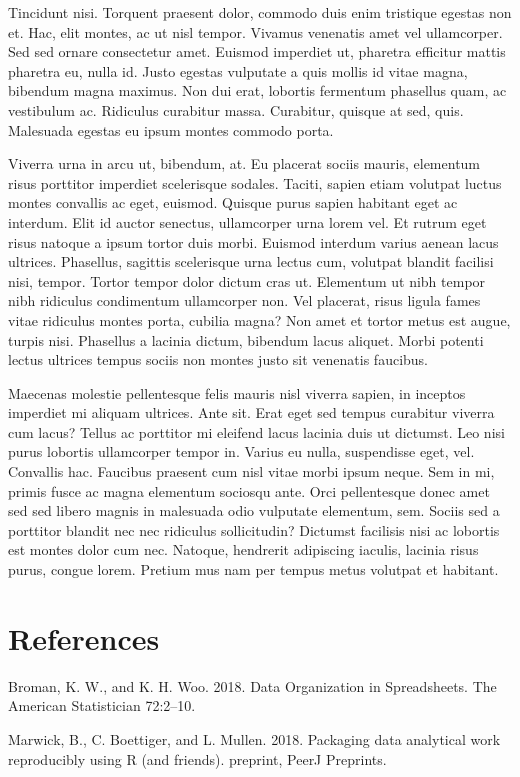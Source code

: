 \documentclass[11pt,]{report}
\begin{document}
Tincidunt nisi. Torquent praesent dolor, commodo duis enim tristique
egestas non et. Hac, elit montes, ac ut nisl tempor. Vivamus venenatis
amet vel ullamcorper. Sed sed ornare consectetur amet. Euismod imperdiet
ut, pharetra efficitur mattis pharetra eu, nulla id. Justo egestas
vulputate a quis mollis id vitae magna, bibendum magna maximus. Non dui
erat, lobortis fermentum phasellus quam, ac vestibulum ac. Ridiculus
curabitur massa. Curabitur, quisque at sed, quis. Malesuada egestas eu
ipsum montes commodo porta.

Viverra urna in arcu ut, bibendum, at. Eu placerat sociis mauris,
elementum risus porttitor imperdiet scelerisque sodales. Taciti, sapien
etiam volutpat luctus montes convallis ac eget, euismod. Quisque purus
sapien habitant eget ac interdum. Elit id auctor senectus, ullamcorper
urna lorem vel. Et rutrum eget risus natoque a ipsum tortor duis morbi.
Euismod interdum varius aenean lacus ultrices. Phasellus, sagittis
scelerisque urna lectus cum, volutpat blandit facilisi nisi, tempor.
Tortor tempor dolor dictum cras ut. Elementum ut nibh tempor nibh
ridiculus condimentum ullamcorper non. Vel placerat, risus ligula fames
vitae ridiculus montes porta, cubilia magna? Non amet et tortor metus
est augue, turpis nisi. Phasellus a lacinia dictum, bibendum lacus
aliquet. Morbi potenti lectus ultrices tempus sociis non montes justo
sit venenatis faucibus.

Maecenas molestie pellentesque felis mauris nisl viverra sapien, in
inceptos imperdiet mi aliquam ultrices. Ante sit. Erat eget sed tempus
curabitur viverra cum lacus? Tellus ac porttitor mi eleifend lacus
lacinia duis ut dictumst. Leo nisi purus lobortis ullamcorper tempor in.
Varius eu nulla, suspendisse eget, vel. Convallis hac. Faucibus praesent
cum nisl vitae morbi ipsum neque. Sem in mi, primis fusce ac magna
elementum sociosqu ante. Orci pellentesque donec amet sed sed libero
magnis in malesuada odio vulputate elementum, sem. Sociis sed a
porttitor blandit nec nec ridiculus sollicitudin? Dictumst facilisis
nisi ac lobortis est montes dolor cum nec. Natoque, hendrerit adipiscing
iaculis, lacinia risus purus, congue lorem. Pretium mus nam per tempus
metus volutpat et habitant.

\hypertarget{references}{%
\chapter*{References}\label{references}}

\hypertarget{refs}{}
\leavevmode\hypertarget{ref-broman_data_2018}{}%
Broman, K. W., and K. H. Woo. 2018. Data Organization in Spreadsheets.
The American Statistician 72:2--10.

\leavevmode\hypertarget{ref-marwick_packaging_2018}{}%
Marwick, B., C. Boettiger, and L. Mullen. 2018. Packaging data
analytical work reproducibly using R (and friends). preprint, PeerJ
Preprints.
\end{document}
